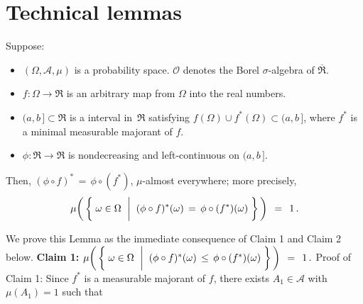 

\section{Technical lemmas}
\setcounter{theorem}{0}
\setcounter{equation}{0}


\renewcommand{\theenumi}{\roman{enumi}}
\renewcommand{\labelenumi}{\textnormal{(\theenumi)}$\;\;$}


\begin{lemma}
\mbox{}\vskip 0.1cm
\noindent
Suppose:
\begin{itemize}
\item
	$(\Omega,\mathcal{A},\mu)$ is a probability space.
	$\mathcal{O}$ denotes the Borel $\sigma$-algebra of $\overline{\Re}$.
\item
	$f : \Omega \longrightarrow \Re$ is an arbitrary map from $\Omega$ into the real numbers.
\item
	$(a,b\,] \subset \Re$ is a interval in \,$\Re$ satisfying $f(\Omega) \cup f^{*}(\Omega) \subset (a,b\,]$,
	where $f^{*}$ is a minimal measurable majorant of $f$.
\item
	$\phi : \Re \longrightarrow \Re$ is nondecreasing and left-continuous on $(a,b\,]$.
\end{itemize}
Then, $(\phi \circ f)^{*} \,=\, \phi \circ (f^{*})$, $\mu$-almost everywhere; more precisely,
\begin{equation*}
\mu\!\left(\,\left\{\;
	\omega \in \Omega
	\,\;\left\vert\;\;
	(\phi \circ f)^{*}(\omega) \,\overset{{\color{white}\vert}}{=}\, \phi \circ (f^{*})(\omega)
	\right.
\,\right\}\,\right)
\,\;=\;\, 1\,.
\end{equation*}
\end{lemma}
\proof
We prove this Lemma as the immediate consequence of Claim 1 and Claim 2 below.
\vskip 0.5cm
\noindent
\textbf{Claim 1:}\quad
$\mu\!\left(\,\left\{\;
	\omega \in \Omega
	\,\;\left\vert\;\;
	(\phi \circ f)^{*}(\omega) \,\overset{{\color{white}\vert}}{\leq}\, \phi \circ (f^{*})(\omega)
	\right.
\,\right\}\,\right)
\,\;=\;\, 1\,.
$
\vskip 0.2cm
\noindent
Proof of Claim 1:\;\;
Since $f^{*}$ is a measurable majorant of $f$,
there exists $A_{1} \in \mathcal{A}$ with $\mu(A_{1}) = 1$ such that
